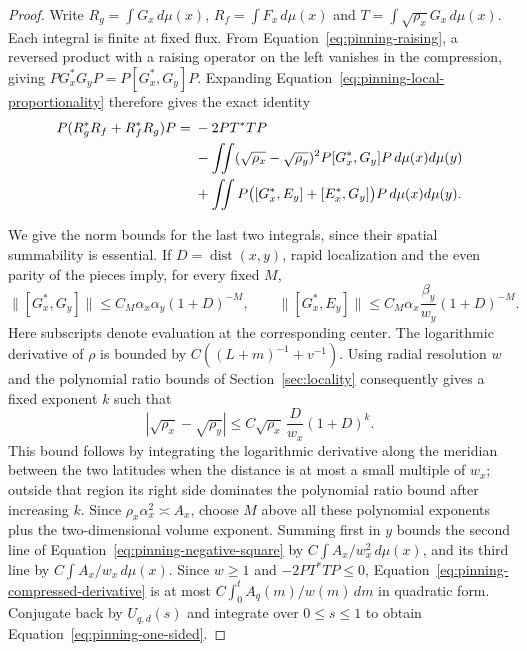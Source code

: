 \begin{proof}
Write $R_g=\int G_x\,d\mu(x)$, $R_f=\int F_x\,d\mu(x)$ and
$T=\int\sqrt{\rho_x}G_x\,d\mu(x)$.  Each integral is finite at fixed
flux.  From Equation~\eqref{eq:pinning-raising}, a reversed product with
a raising operator on the left vanishes in the compression, giving
$PG_x^*G_yP=P[G_x^*,G_y]P$.  Expanding
Equation~\eqref{eq:pinning-local-proportionality} therefore gives the
exact identity
\begin{align}
 P(R_g^*R_f+R_f^*R_g)P
 ={}&-2PT^*TP \notag\\
 &-\iint(\sqrt{\rho_x}-\sqrt{\rho_y})^2
          P[G_x^*,G_y]P\,d\mu(x)d\mu(y) \notag\\
 &+\iint P\bigl([G_x^*,E_y]+[E_x^*,G_y]\bigr)P
            \,d\mu(x)d\mu(y).
 \label{eq:pinning-negative-square}
\end{align}

We give the norm bounds for the last two integrals, since their spatial
summability is essential.  If $D=\operatorname{dist}(x,y)$, rapid
localization and the even parity of the pieces imply, for every fixed
$M$,
\[
 \|[G_x^*,G_y]\|\le C_M\alpha_x\alpha_y(1+D)^{-M},
 \qquad
 \|[G_x^*,E_y]\|\le
        C_M\alpha_x\frac{\beta_y}{w_y}(1+D)^{-M}.
\]
Here subscripts denote evaluation at the corresponding center.
The logarithmic derivative of $\rho$ is bounded by
$C((L+m)^{-1}+v^{-1})$.  Using radial resolution $w$ and the polynomial
ratio bounds of Section~\ref{sec:locality} consequently gives a fixed
exponent $k$ such that
\[
 |\sqrt{\rho_x}-\sqrt{\rho_y}|
 \le C\sqrt{\rho_x}\,\frac{D}{w_x}(1+D)^k.
\]
This bound follows by integrating the logarithmic derivative along the
meridian between the two latitudes when the distance is at most a small
multiple of $w_x$; outside that region its
right side dominates the polynomial ratio bound after increasing $k$.
Since $\rho_x\alpha_x^2\asymp A_x$, choose $M$ above all these
polynomial exponents plus the two-dimensional volume exponent.  Summing
first in $y$ bounds the second line of
Equation~\eqref{eq:pinning-negative-square} by
$C\int A_x/w_x^2\,d\mu(x)$, and its third line by
$C\int A_x/w_x\,d\mu(x)$.  Since $w\ge1$ and $-2PT^*TP\le0$,
Equation~\eqref{eq:pinning-compressed-derivative} is at most
$C\int_0^t A_q(m)/w(m)\,dm$ in quadratic form.  Conjugate back by
$U_{q,d}(s)$ and integrate over $0\le s\le1$ to obtain
Equation~\eqref{eq:pinning-one-sided}.
\end{proof}

